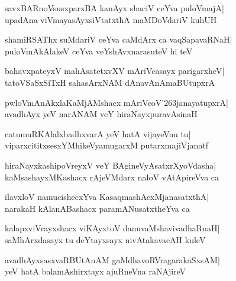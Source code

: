 \documentclass[twoside,12pt,openright]{book}
\def\S{\char'263}
\newcounter{shloka}[chapter]
\begin{document}
\begin{shloka}%
savxBARnoVsusxparxBA kanAyx shaciV ceYva puloVmajA|\\
upadAna viVmayasAyxsiVtatxthA maMDoVdariV kuhUH
\end{shloka}

\begin{shloka}%
shamiRSAThx suMdariV ceYva caMdArx ca vaqSapavaRNaH|\\
puloVmAkAlakeV ceYva veYshAvxnarasuteV hi teV
\end{shloka}

\begin{shloka}%
bahavxpateyxV mahAsatetxvXV mAriVcasayx parigarxheV|\\
tatoVSaSxSiTxH sahasArxNAM dAnavAnAmaBUtupxrA
\end{shloka}

\begin{shloka}%
pwloVmAnAkxlaKaMjAMshacx mAriVcoV\S janayatupxrA|\\
avadhAyx yeV narANAM veY hiraNayxpuravAsinaH
\end{shloka}

\begin{shloka}%
catumuRKAlalxbadhxvarA yeV hatA vijayeVnu tu|\\
viparxcititxsesxYMhikeVyamugarxM putarxmajiVjanatf
\end{shloka}

\begin{shloka}%
hiraNayxkashipoVreyxV veY BAgineVyAsatxrXyoVdasha|\\
kaMsashayxMKashacx rAjeVMdarx naloV vAtApireVva ca
\end{shloka}

\begin{shloka}%
ilavxloV namucishecxYva KasaqmashAcxMjanasatxthA|\\
narakaH kAlanABashacx paramANusatxtheYva ca
\end{shloka}

\begin{shloka}%
kalapxviVrayxshacx viKAyxtoV danuvaMshavivadhaRnaH|\\
saMhArxdasayx tu deYtayxsayx nivAtakavacAH kuleV
\end{shloka}

\begin{shloka}%
avadhAyxsasxvaRBUtAnAM gaMdhavoRVragarakaSxsAM|\\
yeV hatA balamAshirxtayx ajuRneVna raNAjireV
\end{shloka}
\end{document}
